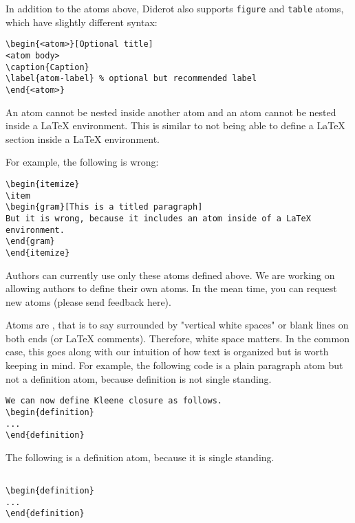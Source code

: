 \begin{important}
In addition to the atoms above, Diderot also supports \lstinline`figure` and \lstinline`table` atoms, which have slightly different syntax:
\begin{lstlisting}
\begin{<atom>}[Optional title]
<atom body>
\caption{Caption}
\label{atom-label} % optional but recommended label
\end{<atom>}
\end{lstlisting}
\end{important}

\begin{important}
An atom cannot be nested inside another atom and an atom cannot be nested inside a LaTeX environment. This is similar to not being able to define a LaTeX section inside a LaTeX environment.

For example, the following is wrong:
\begin{lstlisting}
\begin{itemize}
\item 
\begin{gram}[This is a titled paragraph]
But it is wrong, because it includes an atom inside of a LaTeX environment.
\end{gram}
\end{itemize}
\end{lstlisting}

\end{important}

\begin{note}
Authors can currently use only these atoms defined above. We are working on allowing authors to define their own atoms.  
%
In the mean time, you can request new atoms  (please send feedback here).
\end{note}

\begin{important}
Atoms are , that is to say surrounded by "vertical
white spaces" or blank lines on both ends (or LaTeX comments).
%
Therefore,  white space  matters. In the common case, this goes along with our intuition of how text is organized but is worth keeping in mind. For example, the following code is a plain paragraph atom but not a definition atom, because definition is not single standing.

\begin{lstlisting}
We can now define Kleene closure as follows.
\begin{definition}
...
\end{definition}
\end{lstlisting}

The following is a definition atom, because it is single standing.
\begin{lstlisting}

\begin{definition}
...
\end{definition}

\end{lstlisting}
\end{important}

